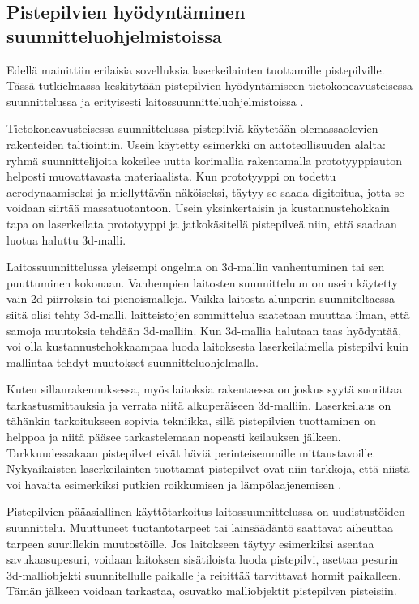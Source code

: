 \subsection{Pistepilvien hyödyntäminen suunnitteluohjelmistoissa}\label{laitossuunnittelu}

Edellä mainittiin erilaisia sovelluksia laserkeilainten tuottamille pistepilville. Tässä tutkielmassa keskitytään pistepilvien hyödyntämiseen tietokoneavusteisessa suunnittelussa  ja erityisesti laitossuunnitteluohjelmistoissa .

Tietokoneavusteisessa suunnittelussa pistepilviä käytetään olemassaolevien rakenteiden taltiointiin. Usein käytetty esimerkki on autoteollisuuden alalta: ryhmä suunnittelijoita kokeilee uutta korimallia rakentamalla prototyyppiauton helposti muovattavasta materiaalista. Kun prototyyppi on todettu aerodynaamiseksi ja miellyttävän näköiseksi, täytyy se saada digitoitua, jotta se voidaan siirtää massatuotantoon. Usein yksinkertaisin ja kustannustehokkain tapa on laserkeilata prototyyppi ja jatkokäsitellä pistepilveä niin, että saadaan luotua haluttu 3d-malli.

Laitossuunnittelussa yleisempi ongelma on 3d-mallin vanhentuminen tai sen puuttuminen kokonaan. Vanhempien laitosten suunnitteluun on usein käytetty vain 2d-piirroksia tai pienoismalleja. Vaikka laitosta alunperin suunniteltaessa siitä olisi tehty 3d-malli, laitteistojen sommittelua saatetaan muuttaa ilman, että samoja muutoksia tehdään 3d-malliin. Kun 3d-mallia halutaan taas hyödyntää, voi olla kustannustehokkaampaa luoda laitoksesta laserkeilaimella pistepilvi kuin mallintaa tehdyt muutokset suunnitteluohjelmalla. \cite{Piipponen}

Kuten sillanrakennuksessa, myös laitoksia rakentaessa on joskus syytä suorittaa tarkastusmittauksia ja verrata niitä alkuperäiseen 3d-malliin. Laserkeilaus on tähänkin tarkoitukseen sopivia tekniikka, sillä pistepilvien tuottaminen on helppoa ja niitä pääsee tarkastelemaan nopeasti keilauksen jälkeen. Tarkkuudessakaan pistepilvet eivät häviä perinteisemmille mittaustavoille. Nykyaikaisten laserkeilainten tuottamat pistepilvet ovat niin tarkkoja, että niistä voi havaita esimerkiksi putkien roikkumisen ja lämpölaajenemisen \cite{Piipponen}. 

Pistepilvien pääasiallinen käyttötarkoitus laitossuunnittelussa on uudistustöiden suunnittelu. Muuttuneet tuotantotarpeet tai lainsäädäntö saattavat aiheuttaa tarpeen suurillekin muutostöille. Jos laitokseen täytyy esimerkiksi asentaa savukaasupesuri, voidaan laitoksen sisätiloista luoda pistepilvi, asettaa pesurin 3d-malliobjekti suunnitellulle paikalle ja reitittää tarvittavat hormit paikalleen. Tämän jälkeen voidaan tarkastaa, osuvatko malliobjektit pistepilven pisteisiin.  

